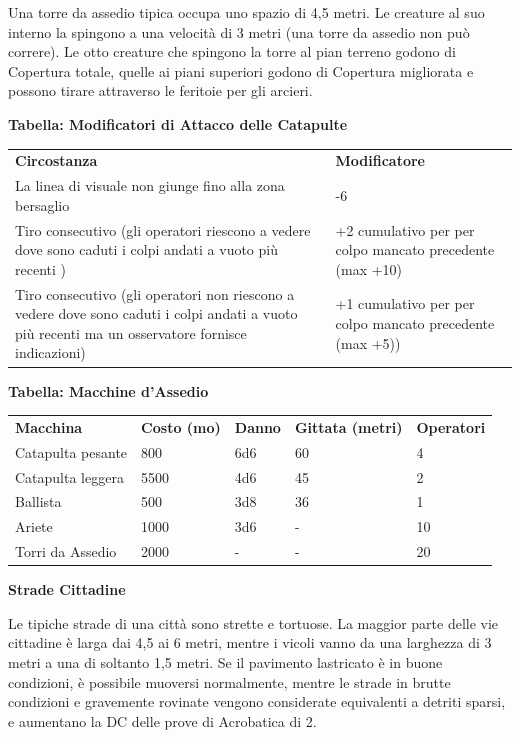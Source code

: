 \documentclass[a4paper,11pt,twoside,openany]{book}
\begin{document}
Una torre da assedio tipica occupa uno spazio di 4,5 metri. Le creature al suo interno la spingono a una velocità di 3 metri (una torre da assedio non può correre). Le otto creature che spingono la torre al pian terreno godono di Copertura totale, quelle ai piani superiori godono di Copertura migliorata e possono tirare attraverso le feritoie per gli arcieri.

\bigskip

\textbf{Tabella: Modificatori di Attacco delle Catapulte}

\begin{tabularx}{0.95\textwidth}{XX}
	\toprule
	\textbf{Circostanza}      & \textbf{Modificatore}\\
	La linea di visuale non giunge fino alla zona bersaglio & -6\\
	Tiro consecutivo (gli operatori riescono a vedere dove sono caduti i colpi andati a vuoto più recenti )   & +2 cumulativo per per colpo  mancato precedente (max +10)\\
	Tiro consecutivo (gli operatori non riescono a vedere dove sono caduti i colpi andati a vuoto più recenti ma un osservatore fornisce indicazioni) & +1 cumulativo per per colpo mancato precedente (max +5))\\
\end{tabularx}

\bigskip

\textbf{Tabella: Macchine d'Assedio}

\medskip

\begin{tabularx}{0.95\textwidth}{XXXXX}
	\toprule
	\textbf{Macchina} & \textbf{Costo (mo)} & \textbf{Danno} & \textbf{Gittata (metri)} & \textbf{Operatori}\\
	Catapulta pesante & 800  & 6d6  & 60   & 4\\
	Catapulta leggera & 5500 & 4d6  & 45   & 2\\
	Ballista& 500  & 3d8  & 36   & 1\\
	Ariete  & 1000 & 3d6  & -    & 10\\
	Torri da Assedio  & 2000 & -    & -    & 20\\
\end{tabularx}

\bigskip

\textbf{Strade Cittadine}

Le tipiche strade di una città sono strette e tortuose. La maggior parte delle vie cittadine è larga dai 4,5 ai 6 metri, mentre i vicoli vanno da una larghezza di 3 metri a una di soltanto 1,5 metri. Se il pavimento lastricato è in buone condizioni, è possibile muoversi normalmente, mentre le strade in brutte condizioni e gravemente rovinate vengono considerate equivalenti a detriti sparsi, e aumentano la DC delle prove di Acrobatica di 2.
\end{document}
